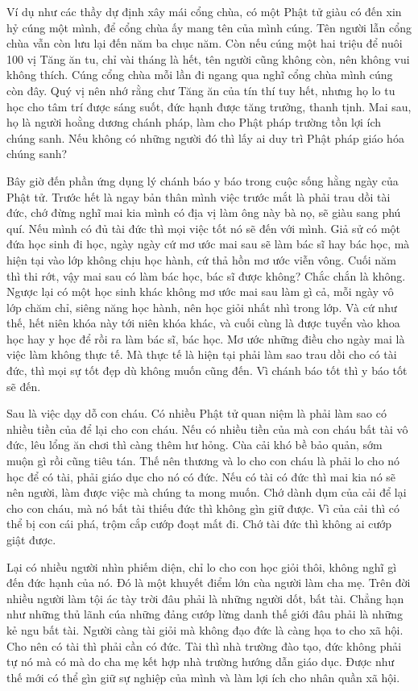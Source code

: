 \documentclass[
  12pt,
  oneside]{book}
\begin{document}
Ví dụ như các thầy dự định xây mái cổng chùa, có một Phật tử giàu có đến xin hỷ cúng một mình, để cổng chùa ấy mang tên của mình cúng. Tên người lẫn cổng chùa vẫn còn lưu lại đến năm ba chục năm. Còn nếu cúng một hai triệu để nuôi 100 vị Tăng ăn tu, chỉ vài tháng là hết, tên người cũng không còn, nên không vui không thích. Cúng cổng chùa mỗi lần đi ngang qua nghĩ cổng chùa mình cúng còn đây. Quý vị nên nhớ rằng chư Tăng ăn của tín thí tuy hết, nhưng họ lo tu học cho tâm trí được sáng suốt, đức hạnh được tăng trưởng, thanh tịnh. Mai sau, họ là người hoằng dương chánh pháp, làm cho Phật pháp trường tồn lợi ích chúng sanh. Nếu không có những người đó thì lấy ai duy trì Phật pháp giáo hóa chúng sanh?

Bây giờ đến phần ứng dụng lý chánh báo y báo trong cuộc sống hằng ngày của Phật tử. Trước hết là ngay bản thân mình việc trước mắt là phải trau dồi tài đức, chớ đừng nghĩ mai kia mình có địa vị làm ông này bà nọ, sẽ giàu sang phú quí. Nếu mình có đủ tài đức thì mọi việc tốt nó sẽ đến với mình. Giả sử có một đứa học sinh đi học, ngày ngày cứ mơ ước mai sau sẽ làm bác sĩ hay bác học, mà hiện tại vào lớp không chịu học hành, cứ thả hồn mơ ước viễn vông. Cuối năm thì thi rớt, vậy mai sau có làm bác học, bác sĩ được không? Chắc chắn là không. Ngược lại có một học sinh khác không mơ ước mai sau làm gì cả, mỗi ngày vô lớp chăm chỉ, siêng năng học hành, nên học giỏi nhất nhì trong lớp. Và cứ như thế, hết niên khóa này tới niên khóa khác, và cuối cùng là được tuyển vào khoa học hay y học để rồi ra làm bác sĩ, bác học. Mơ ước những điều cho ngày mai là việc làm không thực tế. Mà thực tế là hiện tại phải làm sao trau dồi cho có tài đức, thì mọi sự tốt đẹp dù không muốn cũng đến. Vì chánh báo tốt thì y báo tốt sẽ đến.

Sau là việc dạy dỗ con cháu. Có nhiều Phật tử quan niệm là phải làm sao có nhiều tiền của để lại cho con cháu. Nếu có nhiều tiền của mà con cháu bất tài vô đức, lêu lổng ăn chơi thì càng thêm hư hỏng. Cùa cải khó bề bảo quản, sớm muộn gì rồi cũng tiêu tán. Thế nên thương và lo cho con cháu là phải lo cho nó học để có tài, phải giáo dục cho nó có đức. Nếu có tài có đức thì mai kia nó sẽ nên người, làm được việc mà chúng ta mong muốn. Chớ dành dụm của cải để lại cho con cháu, mà nó bất tài thiếu đức thì không gìn giữ được. Vì của cải thì có thể bị con cái phá, trộm cắp cướp đoạt mất đi. Chớ tài đức thì không ai cướp giật được.

Lại có nhiều người nhìn phiếm diện, chỉ lo cho con học giỏi thôi, không nghĩ gì đến đức hạnh của nó. Đó là một khuyết điểm lớn cùa người làm cha mẹ. Trên đời nhiều người làm tội ác tày trời đâu phải là những người dốt, bất tài. Chẳng hạn như những thủ lãnh cúa những đảng cướp lừng danh thế giới đâu phải là những kẻ ngu bất tài. Người càng tài giỏi mà không đạo đức là càng họa to cho xã hội. Cho nên có tài thì phải cần có đức. Tài thì nhà trường đào tạo, đức không phải tự nó mà có mà do cha mẹ kết hợp nhà trường hướng dẫn giáo dục. Được như thế mới có thể gìn giữ sự nghiệp của mình và làm lợi ích cho nhân quần xã hội.
\end{document}
